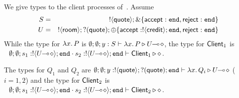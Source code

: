 \begin{example}\label{exam:type}
We give types to the client
processes of~.
Assume 
\begin{eqnarray*}
S & = & \btout{\Quote} \btbra{\accept: \tinact, \reject: \tinact} \\
U & = & \btout{\rtype} \btinp{\Quote} \btsel{\accept: \btout{\creditc} \tinact, \reject: \tinact }
\end{eqnarray*}
While the type for $\abs{x}{P}$ is $\es; \es; y: S \proves \abs{x}{P} \hastype \lhot{U}$,
the type for $\Client_1$ is
$~~
	\es; \es; s_1: \btout{\lhot{U}} \tinact \cat s_2: \btout{\lhot{U}} \tinact \proves \Client_1 \hastype \Proc
$.


The types for $Q_1$ and $Q_2$ are
$	\es; \es; y: \btout{\Quote} \btinp{\Quote} \tinact \proves \abs{x}{Q_i} \hastype \lhot{U}
$ ($i=1,2$)
and the type for $\Client_2$ is
$~~
	\es; \es; s_1: \btout{\lhot{U}} \tinact \cat s_2: \btout{\lhot{U}} \tinact \proves \Client_2 \hastype \Proc
$.
\end{example}

